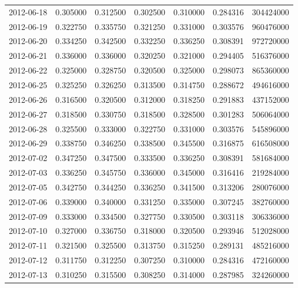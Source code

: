 \begin{tabular}{lrrrrrr}
2012-06-18 &    0.305000 &    0.312500 &    0.302500 &    0.310000 &    0.284316 &   304424000 \\
2012-06-19 &    0.322750 &    0.335750 &    0.321250 &    0.331000 &    0.303576 &   960476000 \\
2012-06-20 &    0.334250 &    0.342500 &    0.332250 &    0.336250 &    0.308391 &   972720000 \\
2012-06-21 &    0.336000 &    0.336000 &    0.320250 &    0.321000 &    0.294405 &   516376000 \\
2012-06-22 &    0.325000 &    0.328750 &    0.320500 &    0.325000 &    0.298073 &   865360000 \\
2012-06-25 &    0.325250 &    0.326250 &    0.313500 &    0.314750 &    0.288672 &   494616000 \\
2012-06-26 &    0.316500 &    0.320500 &    0.312000 &    0.318250 &    0.291883 &   437152000 \\
2012-06-27 &    0.318500 &    0.330750 &    0.318500 &    0.328500 &    0.301283 &   506064000 \\
2012-06-28 &    0.325500 &    0.333000 &    0.322750 &    0.331000 &    0.303576 &   545896000 \\
2012-06-29 &    0.338750 &    0.346250 &    0.338500 &    0.345500 &    0.316875 &   616508000 \\
2012-07-02 &    0.347250 &    0.347500 &    0.333500 &    0.336250 &    0.308391 &   581684000 \\
2012-07-03 &    0.336250 &    0.345750 &    0.336000 &    0.345000 &    0.316416 &   219284000 \\
2012-07-05 &    0.342750 &    0.344250 &    0.336250 &    0.341500 &    0.313206 &   280076000 \\
2012-07-06 &    0.339000 &    0.340000 &    0.331250 &    0.335000 &    0.307245 &   382760000 \\
2012-07-09 &    0.333000 &    0.334500 &    0.327750 &    0.330500 &    0.303118 &   306336000 \\
2012-07-10 &    0.327000 &    0.336750 &    0.318000 &    0.320500 &    0.293946 &   512028000 \\
2012-07-11 &    0.321500 &    0.325500 &    0.313750 &    0.315250 &    0.289131 &   485216000 \\
2012-07-12 &    0.311750 &    0.312250 &    0.307250 &    0.310000 &    0.284316 &   472160000 \\
2012-07-13 &    0.310250 &    0.315500 &    0.308250 &    0.314000 &    0.287985 &   324260000 \\

\end{tabular}
